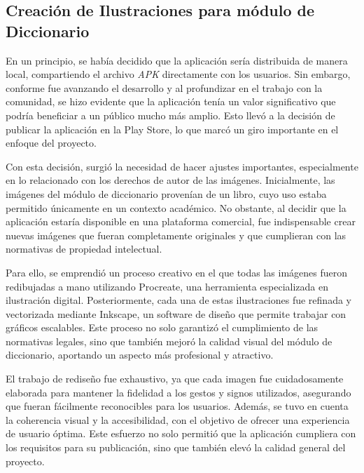 
\subsection{Creación de Ilustraciones para módulo de Diccionario}

En un principio, se había decidido que la aplicación sería distribuida de manera local, compartiendo el archivo \textit{APK} directamente con los usuarios. Sin embargo, conforme fue avanzando el desarrollo y al profundizar en el trabajo con la comunidad, se hizo evidente que la aplicación tenía un valor significativo que podría beneficiar a un público mucho más amplio. Esto llevó a la decisión de publicar la aplicación en la Play Store, lo que marcó un giro importante en el enfoque del proyecto.

Con esta decisión, surgió la necesidad de hacer ajustes importantes, especialmente en lo relacionado con los derechos de autor de las imágenes. Inicialmente, las imágenes del módulo de diccionario provenían de un libro, cuyo uso estaba permitido únicamente en un contexto académico. No obstante, al decidir que la aplicación estaría disponible en una plataforma comercial, fue indispensable crear nuevas imágenes que fueran completamente originales y que cumplieran con las normativas de propiedad intelectual.

Para ello, se emprendió un proceso creativo en el que todas las imágenes fueron redibujadas a mano utilizando Procreate, una herramienta especializada en ilustración digital. Posteriormente, cada una de estas ilustraciones fue refinada y vectorizada mediante Inkscape, un software de diseño que permite trabajar con gráficos escalables. Este proceso no solo garantizó el cumplimiento de las normativas legales, sino que también mejoró la calidad visual del módulo de diccionario, aportando un aspecto más profesional y atractivo.

El trabajo de rediseño fue exhaustivo, ya que cada imagen fue cuidadosamente elaborada para mantener la fidelidad a los gestos y signos utilizados, asegurando que fueran fácilmente reconocibles para los usuarios. Además, se tuvo en cuenta la coherencia visual y la accesibilidad, con el objetivo de ofrecer una experiencia de usuario óptima. Este esfuerzo no solo permitió que la aplicación cumpliera con los requisitos para su publicación, sino que también elevó la calidad general del proyecto.



